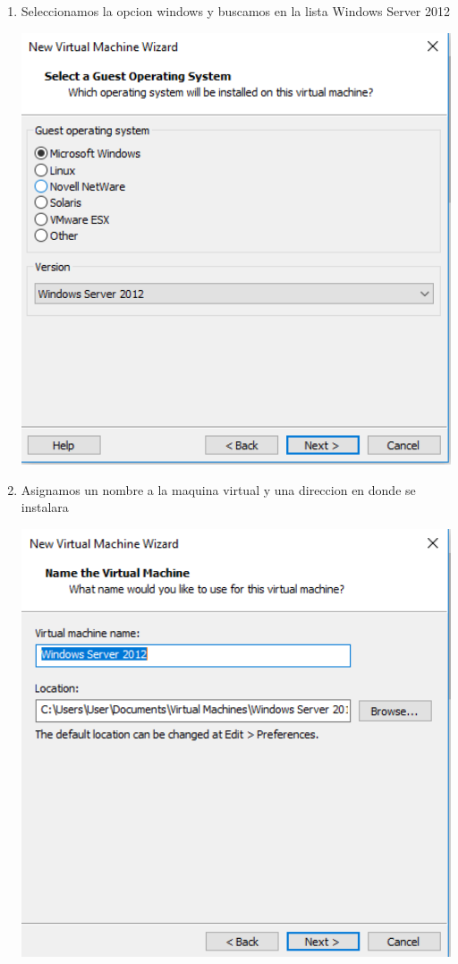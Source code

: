 \begin{enumerate}[1.]
	\item Seleccionamos la opcion windows y buscamos en la lista Windows Server 2012

	\begin{center}
	\includegraphics[width=15cm]{./Imagenes/img3server} 
	\end{center}
	
	\item Asignamos un nombre a la maquina virtual y una direccion en donde se instalara

	\begin{center}
	\includegraphics[width=15cm]{./Imagenes/img4server} 
	\end{center}



\end{enumerate}
